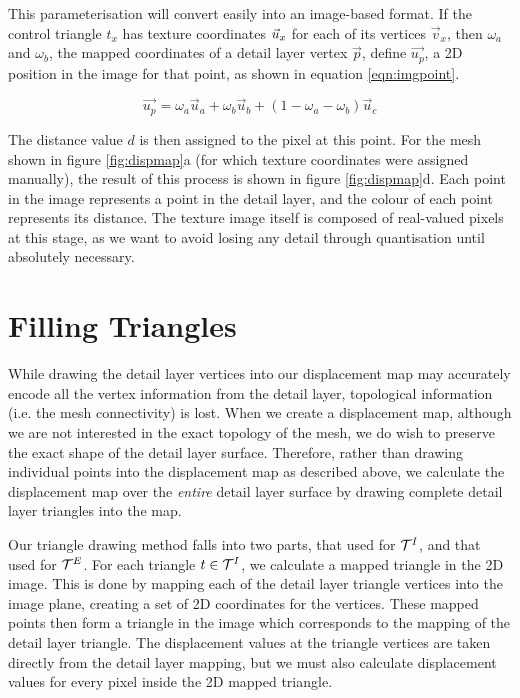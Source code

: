 This parameterisation will convert easily into an image-based format. If the control triangle $t_x$ has texture coordinates $\vec{u}_x\symbol{texcoord}$ for each of its vertices $\vec{v}_x$, then $\omega_a$ and $\omega_b$, the mapped coordinates of a detail layer vertex $\vec{p}$, define $\vec{u_{p}}$, a 2D position in the image for that point, as shown in equation \ref{eqn:imgpoint}.

\begin{equation} \label{eqn:imgpoint}
\vec{u_{p}} = \omega_a\vec{u}_a + \omega_b\vec{u}_b + (1-\omega_a-\omega_b)\vec{u}_c
\end{equation}

The distance value $d$ is then assigned to the pixel at this point. For the mesh shown in figure \ref{fig:dispmap}a (for which texture coordinates were assigned manually), the result of this process is shown in figure \ref{fig:dispmap}d. Each point in the image represents a point in the detail layer, and the colour of each point represents its distance. The texture image itself is composed of real-valued pixels at this stage, as we want to avoid losing any detail through quantisation until absolutely necessary.

\section{\label{sec:dispmapcreation:triangles}Filling Triangles}

While drawing the detail layer vertices into our displacement map may accurately encode all the vertex information from the detail layer, topological information (i.e. the mesh connectivity) is lost. When we create a displacement map, although we are not interested in the exact topology of the mesh, we do wish to preserve the exact shape of the detail layer surface. Therefore, rather than drawing individual points into the displacement map as described above, we calculate the displacement map over the {\it entire} detail layer surface by drawing complete detail layer triangles into the map.

Our triangle drawing method falls into two parts, that used for ${\cal T}^I$, and that used for ${\cal T}^E$. For each triangle $t \in {\cal T}^I$, we calculate a mapped triangle in the 2D image. This is done by mapping each of the detail layer triangle vertices into the image plane, creating a set of 2D coordinates for the vertices. These mapped points then form a triangle in the image which corresponds to the mapping of the detail layer triangle. The displacement values at the triangle vertices are taken directly from the detail layer mapping, but we must also calculate displacement values for every pixel inside the 2D mapped triangle.

